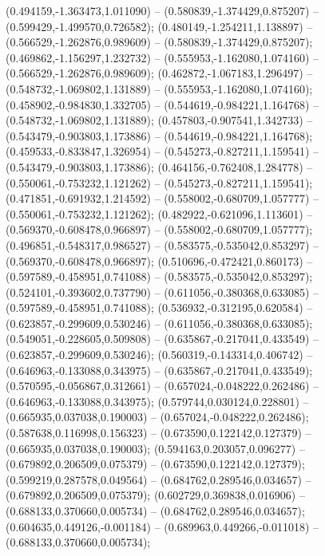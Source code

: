  (0.494159,-1.363473,1.011090) -- (0.580839,-1.374429,0.875207) -- (0.599429,-1.499570,0.726582);
 (0.480149,-1.254211,1.138897) -- (0.566529,-1.262876,0.989609) -- (0.580839,-1.374429,0.875207);
 (0.469862,-1.156297,1.232732) -- (0.555953,-1.162080,1.074160) -- (0.566529,-1.262876,0.989609);
 (0.462872,-1.067183,1.296497) -- (0.548732,-1.069802,1.131889) -- (0.555953,-1.162080,1.074160);
 (0.458902,-0.984830,1.332705) -- (0.544619,-0.984221,1.164768) -- (0.548732,-1.069802,1.131889);
 (0.457803,-0.907541,1.342733) -- (0.543479,-0.903803,1.173886) -- (0.544619,-0.984221,1.164768);
 (0.459533,-0.833847,1.326954) -- (0.545273,-0.827211,1.159541) -- (0.543479,-0.903803,1.173886);
 (0.464156,-0.762408,1.284778) -- (0.550061,-0.753232,1.121262) -- (0.545273,-0.827211,1.159541);
 (0.471851,-0.691932,1.214592) -- (0.558002,-0.680709,1.057777) -- (0.550061,-0.753232,1.121262);
 (0.482922,-0.621096,1.113601) -- (0.569370,-0.608478,0.966897) -- (0.558002,-0.680709,1.057777);
 (0.496851,-0.548317,0.986527) -- (0.583575,-0.535042,0.853297) -- (0.569370,-0.608478,0.966897);
 (0.510696,-0.472421,0.860173) -- (0.597589,-0.458951,0.741088) -- (0.583575,-0.535042,0.853297);
 (0.524101,-0.393602,0.737790) -- (0.611056,-0.380368,0.633085) -- (0.597589,-0.458951,0.741088);
 (0.536932,-0.312195,0.620584) -- (0.623857,-0.299609,0.530246) -- (0.611056,-0.380368,0.633085);
 (0.549051,-0.228605,0.509808) -- (0.635867,-0.217041,0.433549) -- (0.623857,-0.299609,0.530246);
 (0.560319,-0.143314,0.406742) -- (0.646963,-0.133088,0.343975) -- (0.635867,-0.217041,0.433549);
 (0.570595,-0.056867,0.312661) -- (0.657024,-0.048222,0.262486) -- (0.646963,-0.133088,0.343975);
 (0.579744,0.030124,0.228801) -- (0.665935,0.037038,0.190003) -- (0.657024,-0.048222,0.262486);
 (0.587638,0.116998,0.156323) -- (0.673590,0.122142,0.127379) -- (0.665935,0.037038,0.190003);
 (0.594163,0.203057,0.096277) -- (0.679892,0.206509,0.075379) -- (0.673590,0.122142,0.127379);
 (0.599219,0.287578,0.049564) -- (0.684762,0.289546,0.034657) -- (0.679892,0.206509,0.075379);
 (0.602729,0.369838,0.016906) -- (0.688133,0.370660,0.005734) -- (0.684762,0.289546,0.034657);
 (0.604635,0.449126,-0.001184) -- (0.689963,0.449266,-0.011018) -- (0.688133,0.370660,0.005734);
